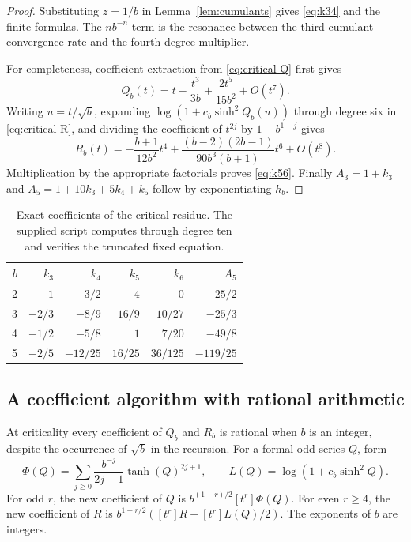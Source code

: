 \documentclass[11pt]{article}
\theoremstyle{definition}
\begin{document}
\begin{proof}
Substituting $z=1/b$ in Lemma~\ref{lem:cumulants} gives
\eqref{eq:k34} and the finite formulas. The $n b^{-n}$ term is the
resonance between the third-cumulant convergence rate and the
fourth-degree multiplier.

For completeness, coefficient extraction from \eqref{eq:critical-Q}
first gives
\[
       Q_b(t)=t-\frac{t^3}{3b}+\frac{2t^5}{15b^2}+O(t^7).
\]
Writing $u=t/\sqrt b$, expanding
$\log(1+c_b\sinh^2 Q_b(u))$ through degree six in
\eqref{eq:critical-R}, and dividing the coefficient of $t^{2j}$
by $1-b^{1-j}$ gives
\[
 R_b(t)=-\frac{b+1}{12b^2}t^4
       +\frac{(b-2)(2b-1)}{90b^3(b+1)}t^6+O(t^8).
\]
Multiplication by the appropriate factorials proves
\eqref{eq:k56}. Finally $A_3=1+k_3$ and
$A_5=1+10k_3+5k_4+k_5$ follow by exponentiating $h_b$.
\end{proof}

\begin{table}[ht]
\centering
\begin{tabular}{@{}rrrrrr@{}}
\toprule
$b$&$k_3$&$k_4$&$k_5$&$k_6$&$A_5$\\
\midrule
2&$-1$&$-3/2$&$4$&$0$&$-25/2$\\
3&$-2/3$&$-8/9$&$16/9$&$10/27$&$-25/3$\\
4&$-1/2$&$-5/8$&$1$&$7/20$&$-49/8$\\
5&$-2/5$&$-12/25$&$16/25$&$36/125$&$-119/25$\\
\bottomrule
\end{tabular}
\caption{Exact coefficients of the critical residue. The supplied script
computes through degree ten and verifies the truncated fixed equation.}
\label{tab:coefficients}
\end{table}

\subsection{A coefficient algorithm with rational arithmetic}

At criticality every coefficient of $Q_b$ and $R_b$ is rational when
$b$ is an integer, despite the occurrence of $\sqrt b$ in the recursion.
For a formal odd series $Q$, form
\[
 \Phi(Q)=\sum_{j\geq0}\frac{b^{-j}}{2j+1}\tanh(Q)^{2j+1},
 \qquad L(Q)=\log\!\left(1+c_b\sinh^2Q\right).
\]
For odd $r$, the new coefficient of $Q$ is
$b^{(1-r)/2}[t^r]\Phi(Q)$. For even $r\geq4$, the new coefficient
of $R$ is
$b^{1-r/2}([t^r]R+[t^r]L(Q)/2)$. The exponents of $b$ are integers.
\end{document}
